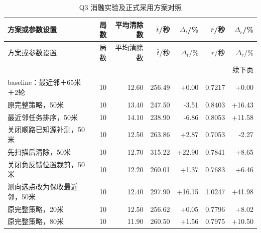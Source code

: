 \begingroup\small\setlength{\tabcolsep}{3pt}
\begin{longtable}{p{}rrrrrr}
\caption{Q3 消融实验及正式采用方案对照}\label{tab:official-q3-1}\\
\toprule
方案或参数设置 & 局数 & 平均清除数 & $\bar t$/秒 & $\Delta_t$/\% & $\bar r$/秒 & $\Delta_r$/\% \\
\midrule\endfirsthead
\toprule
方案或参数设置 & 局数 & 平均清除数 & $\bar t$/秒 & $\Delta_t$/\% & $\bar r$/秒 & $\Delta_r$/\% \\
\midrule\endhead
\midrule\multicolumn{7}{r}{续下页}\\\endfoot
\bottomrule\endlastfoot
baseline：最近邻＋65米＋2轮 & 10 & 12.60 & 256.49 & +0.00 & 0.7217 & +0.00 \\
原完整策略，50米 & 10 & 13.40 & 247.50 & -3.51 & 0.8403 & +16.43 \\
最近邻任务排序，50米 & 10 & 14.10 & 238.90 & -6.86 & 0.8053 & +11.58 \\
关闭顺路已知源补测，50米 & 10 & 12.50 & 263.86 & +2.87 & 0.7053 & -2.27 \\
先扫描后清除，50米 & 10 & 12.70 & 315.22 & +22.90 & 0.7841 & +8.65 \\
关闭负反馈位置裁剪，50米 & 10 & 12.20 & 260.01 & +1.37 & 0.7683 & +6.46 \\
测向选点改为保收最近邻，50米 & 10 & 12.40 & 297.90 & +16.15 & 1.0247 & +41.98 \\
原完整策略，20米 & 10 & 12.50 & 256.62 & +0.05 & 0.7796 & +8.02 \\
原完整策略，80米 & 10 & 11.90 & 260.50 & +1.56 & 0.7975 & +10.50 \\
\end{longtable}\endgroup
